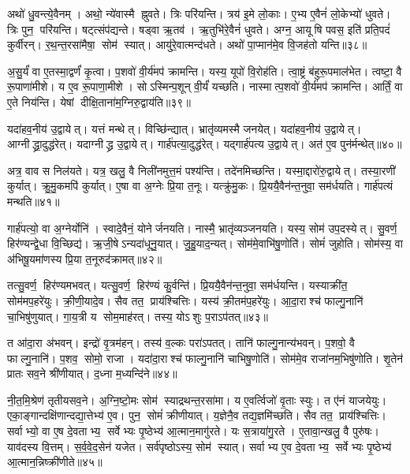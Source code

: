 अथो॑ धु॒वन्त्ये॒वैनम्। अथो॒ न्ये॑वास्मै ह्नुवते। त्रिः परि॑यन्ति। त्रय॑ इ॒मे लो॒काः। ए॒भ्य ए॒वैनं॑ लो॒केभ्यो॑ धुवते। त्रिः पुन॒ परि॑यन्ति। षट्त्संप॑द्यन्ते। षड्वा ऋ॒तव॑। ऋ॒तुभि॑रे॒वैनं॑ धुवते। अग्न॒ आयूषि पवस॒ इति॑ प्रति॒पदं॑ कुर्वीरन्। र॒थ॒न्त॒रसा॑मैषा॒ सोम॑ स्यात्। आयु॑रे॒वात्मन्द॑धते। अथो॑ पा॒प्मान॑मे॒व वि॒जह॑तो यन्ति॥३८॥\anuvakamend[अ॒भिजि॑त्यै पृथि॒व्याश्च॒ स्याद॑ध्व॒र्युर्ब्रू॑याल्लो॒कयो॒ परि॑ददति कुर्वीर॒स्त्रीणि॑ च]

अ॒सु॒र्यं॑ वा ए॒तस्मा॒द्वर्णं॑ कृ॒त्वा। प॒शवो॑ वी॒र्य॑मप॑ क्रामन्ति। यस्य॒ यूपो॑ वि॒रोह॑ति। त्वा॒ष्ट्रं ब॑हुरू॒पमाल॑भेत। त्वष्टा॒ वै रू॒पाणा॑मीशे। य ए॒व रू॒पाणा॒मीशे। सोऽस्मिन्प॒शून् वी॒र्यं॑ यच्छति। नास्मात्प॒शवो॑ वी॒र्य॑मप॑ क्रामन्ति। आर्तिं॒ वा ए॒ते निय॑न्ति। येषां दीक्षि॒ताना॑म॒ग्निरु॒द्वाय॑ति॥३९॥

यदा॑हव॒नीय॑ उ॒द्वायेत्। यत्तं मन्थेत्। विच्छि॑न्द्यात्। भ्रातृ॑व्यमस्मै जनयेत्। यदा॑हव॒नीय॑ उ॒द्वायेत्। आग्नीद्ध्रा॒दुद्ध॑रेत्। यदाग्नीद्ध्र उ॒द्वायेत्। गार्\mbox{}ह॑पत्या॒दुद्ध॑रेत्। यद्गार्\mbox{}ह॑पत्य उ॒द्वायेत्। अत॑ ए॒व पुन॑र्मन्थेत्॥४०॥

अत्र॒ वाव स निल॑यते। यत्र॒ खलु॒ वै निली॑नमुत्त॒मं पश्य॑न्ति। तदे॑नमिच्छन्ति। यस्मा॒द्दारो॑रु॒द्वायेत्। तस्या॒रणी॑ कुर्यात्। क्रु॒मु॒कमपि॑ कुर्यात्। ए॒षा वा अ॒ग्नेः प्रि॒या त॒नूः। यत्क्रु॑मु॒कः। प्रि॒ययै॒वैन॑न्त॒नुवा॒ सम॑र्धयति। गार्\mbox{}ह॑पत्यं मन्थति॥४१॥

गार्\mbox{}ह॑पत्यो॒ वा अ॒ग्नेर्योनि॑। स्वादे॒वैनं॒ योनेर्जनयति। नास्मै॒ भ्रातृ॑व्यञ्जनयति। यस्य॒ सोम॑ उप॒दस्येत्। सु॒वर्ण॒ हिर॑ण्यन्द्वे॒धा वि॒च्छिद्य॑। ऋ॒जी॒षेऽन्यदा॑धूनु॒यात्। जु॒हु॒याद॒न्यत्। सोम॑मे॒वाभि॑षु॒णोति॑। सोमं॑ जुहोति। सोम॑स्य॒ वा अ॑भिषू॒यमा॑णस्य प्रि॒या त॒नूरुद॑क्रामत्॥४२॥

तत्सु॒वर्ण॒ हिर॑ण्यमभवत्। यत्सु॒वर्ण॒ हिर॑ण्यं कु॒र्वन्ति॑। प्रि॒ययै॒वैन॑न्त॒नुवा॒ सम॑र्धयन्ति। यस्याक्री॑त॒ सोम॑मप॒हरे॑युः। क्री॒णी॒यादे॒व। सैव तत॒ प्राय॑श्चित्तिः। यस्य॑ क्री॒तम॑प॒हरे॑युः। आ॒दा॒राश्च॑ फाल्गु॒नानि॑ चा॒भिषु॑णुयात्। गा॒य॒त्री य सोम॒माह॑रत्। तस्य॒ योऽशुः प॒राऽप॑तत्॥४३॥

त आ॑दा॒रा अ॑भवन्। इन्द्रो॑ वृ॒त्रम॑हन्। तस्य॑ व॒ल्कः परा॑ऽपतत्। तानि॑ फाल्गु॒नान्य॑भवन्। प॒शवो॒ वै फाल्गु॒नानि॑। प॒शव॒ सोमो॒ राजा। यदा॑दा॒राश्च॑ फाल्गु॒नानि॑ चाभिषु॒णोति॑। सोम॑मे॒व राजा॑नम॒भिषु॑णोति। शृ॒तेन॑ प्रातः सव॒ने श्री॑णीयात्। द॒ध्ना म॒ध्यन्दि॑ने॥४४॥

नी॒त॒मि॒श्रेण॑ तृतीयसव॒ने। अ॒ग्नि॒ष्टो॒मः सोम॑ स्याद्रथन्त॒रसा॑मा। य ए॒वर्त्विजो॑ वृ॒ताः स्युः। त ए॑नं याजयेयुः। एका॒ङ्गान्दक्षि॑णान्दद्या॒त्तेभ्य॑ ए॒व। पुन॒ सोमं॑ क्रीणीयात्। य॒ज्ञेनै॒व तद्य॒ज्ञमि॑च्छति। सैव तत॒ प्राय॑श्चित्तिः। सर्वाभ्यो॒ वा ए॒ष दे॒वताभ्य॒ सर्वेभ्यः पृ॒ष्ठेभ्य॑ आ॒त्मान॒मागु॑रते। यः स॒त्राया॑गु॒रते। ए॒तावा॒न्खलु॒ वै पुरु॑षः। याव॑दस्य वि॒त्तम्। स॒र्व॒वे॒द॒सेन॑ यजेत। सर्व॑पृष्ठोऽस्य॒ सोम॑ स्यात्। सर्वाभ्य ए॒व दे॒वताभ्य॒ सर्वेभ्यः पृ॒ष्ठेभ्य॑ आ॒त्मान॒न्निष्क्री॑णीते॥४५॥\anuvakamend[उ॒द्वाय॑ति मन्थेन्मन्थत्यक्रामत्प॒राऽप॑तन्म॒ध्यन्दि॑न आगु॒रते॒ पञ्च॑ च]

